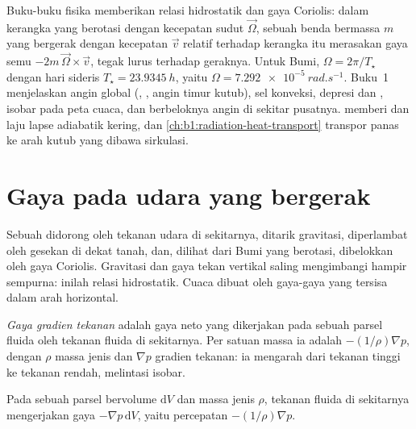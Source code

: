 \begin{recall}
Buku-buku fisika memberikan relasi hidrostatik dan gaya Coriolis: dalam kerangka yang berotasi dengan kecepatan sudut $\vec\Omega$, sebuah benda bermassa $m$ yang bergerak dengan kecepatan $\vec v$ relatif terhadap kerangka itu merasakan gaya semu $-2m\,\vec\Omega\times\vec v$, tegak lurus terhadap geraknya. Untuk Bumi, $\Omega = 2\pi/T_\star$ dengan hari sideris $T_\star = \qty{23.9345}{h}$, yaitu $\Omega = \qty{7.292e-5}{rad.s^{-1}}$. Buku~1 menjelaskan angin global (, , angin timur kutub), sel konveksi, depresi dan , isobar pada peta cuaca, dan berbeloknya angin di sekitar pusatnya.  memberi  dan laju lapse adiabatik kering, dan \cref{ch:b1:radiation-heat-transport} transpor panas ke arah kutub yang dibawa sirkulasi.
\end{recall}

\section{Gaya pada udara yang bergerak}\label{sec:b1:atmospheric-circulation:forces}

Sebuah  didorong oleh tekanan udara di sekitarnya, ditarik gravitasi, diperlambat oleh gesekan di dekat tanah, dan, dilihat dari Bumi yang berotasi, dibelokkan oleh gaya Coriolis. Gravitasi dan gaya tekan vertikal saling mengimbangi hampir sempurna: inilah relasi hidrostatik. Cuaca dibuat oleh gaya-gaya yang tersisa dalam arah horizontal.

\begin{definition}\label{def:b1:atmospheric-circulation:pgf}
\emph{Gaya gradien tekanan} adalah gaya neto yang dikerjakan pada sebuah parsel fluida oleh tekanan fluida di sekitarnya. Per satuan massa ia adalah $-(1/\rho)\nabla p$, dengan $\rho$ massa jenis dan $\nabla p$ gradien tekanan: ia mengarah dari tekanan tinggi ke tekanan rendah, melintasi isobar.
\end{definition}

\begin{proposition}\label{prop:b1:atmospheric-circulation:pgf}
Pada sebuah parsel bervolume $\mathrm dV$ dan massa jenis $\rho$, tekanan fluida di sekitarnya mengerjakan gaya $-\nabla p\,\mathrm dV$, yaitu percepatan $-(1/\rho)\nabla p$.
\end{proposition}

